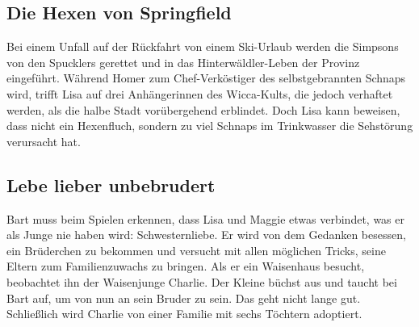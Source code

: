 
\subsection{Die Hexen von Springfield}
Bei einem Unfall auf der Rückfahrt von einem Ski-Urlaub werden die Simpsons von den Spucklers gerettet und in das Hinterwäldler-Leben der Provinz eingeführt. Während Homer zum Chef-Verköstiger des selbstgebrannten Schnaps wird, trifft Lisa auf drei Anhängerinnen des Wicca-Kults, die jedoch verhaftet werden, als die halbe Stadt vorübergehend erblindet. Doch Lisa kann beweisen, dass nicht ein Hexenfluch, sondern zu viel Schnaps im Trinkwasser die Sehstörung verursacht hat.


\subsection{Lebe lieber unbebrudert}
Bart muss beim Spielen erkennen, dass Lisa und Maggie etwas verbindet, was er als Junge nie haben wird: Schwesternliebe. Er wird von dem Gedanken besessen, ein Brüderchen zu bekommen und versucht mit allen möglichen Tricks, seine Eltern zum Familienzuwachs zu bringen. Als er ein Waisenhaus besucht, beobachtet ihn der Waisenjunge Charlie. Der Kleine büchst aus und taucht bei Bart auf, um von nun an sein Bruder zu sein. Das geht nicht lange gut. Schließlich wird Charlie von einer Familie mit sechs Töchtern adoptiert.



